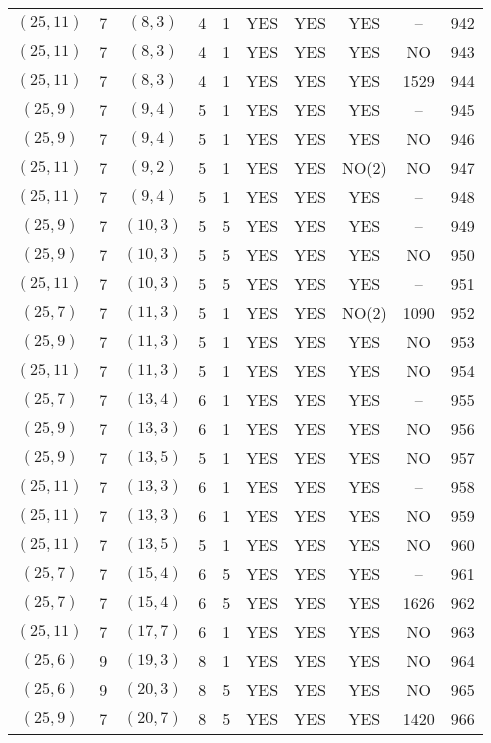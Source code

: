 \begin{longtable}{|c|c|c|c|c|c|c|c|c|c|}
$(25, 11)$ & 7 & $(8, 3)$ & 4 & 1 & YES & YES & YES & -- & 942\\
$(25, 11)$ & 7 & $(8, 3)$ & 4 & 1 & YES & YES & YES & NO & 943\\
$(25, 11)$ & 7 & $(8, 3)$ & 4 & 1 & YES & YES & YES & 1529 & 944\\
$(25, 9)$ & 7 & $(9, 4)$ & 5 & 1 & YES & YES & YES & -- & 945\\
$(25, 9)$ & 7 & $(9, 4)$ & 5 & 1 & YES & YES & YES & NO & 946\\
$(25, 11)$ & 7 & $(9, 2)$ & 5 & 1 & YES & YES & NO(2) & NO & 947\\
$(25, 11)$ & 7 & $(9, 4)$ & 5 & 1 & YES & YES & YES & -- & 948\\
$(25, 9)$ & 7 & $(10, 3)$ & 5 & 5 & YES & YES & YES & -- & 949\\
$(25, 9)$ & 7 & $(10, 3)$ & 5 & 5 & YES & YES & YES & NO & 950\\
$(25, 11)$ & 7 & $(10, 3)$ & 5 & 5 & YES & YES & YES & -- & 951\\
$(25, 7)$ & 7 & $(11, 3)$ & 5 & 1 & YES & YES & NO(2) & 1090 & 952\\
$(25, 9)$ & 7 & $(11, 3)$ & 5 & 1 & YES & YES & YES & NO & 953\\
$(25, 11)$ & 7 & $(11, 3)$ & 5 & 1 & YES & YES & YES & NO & 954\\
$(25, 7)$ & 7 & $(13, 4)$ & 6 & 1 & YES & YES & YES & -- & 955\\
$(25, 9)$ & 7 & $(13, 3)$ & 6 & 1 & YES & YES & YES & NO & 956\\
$(25, 9)$ & 7 & $(13, 5)$ & 5 & 1 & YES & YES & YES & NO & 957\\
$(25, 11)$ & 7 & $(13, 3)$ & 6 & 1 & YES & YES & YES & -- & 958\\
$(25, 11)$ & 7 & $(13, 3)$ & 6 & 1 & YES & YES & YES & NO & 959\\
$(25, 11)$ & 7 & $(13, 5)$ & 5 & 1 & YES & YES & YES & NO & 960\\
$(25, 7)$ & 7 & $(15, 4)$ & 6 & 5 & YES & YES & YES & -- & 961\\
$(25, 7)$ & 7 & $(15, 4)$ & 6 & 5 & YES & YES & YES & 1626 & 962\\
$(25, 11)$ & 7 & $(17, 7)$ & 6 & 1 & YES & YES & YES & NO & 963\\
$(25, 6)$ & 9 & $(19, 3)$ & 8 & 1 & YES & YES & YES & NO & 964\\
$(25, 6)$ & 9 & $(20, 3)$ & 8 & 5 & YES & YES & YES & NO & 965\\
$(25, 9)$ & 7 & $(20, 7)$ & 8 & 5 & YES & YES & YES & 1420 & 966\\

\end{longtable}
